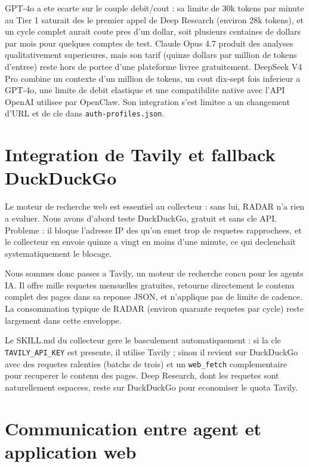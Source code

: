 \documentclass[12pt,a4paper,openany]{report}
\begin{document}
GPT-4o a ete ecarte sur le couple debit/cout : sa limite de 30k tokens par minute au Tier 1 saturait des le premier appel de Deep Research (environ 28k tokens), et un cycle complet aurait coute pres d'un dollar, soit plusieurs centaines de dollars par mois pour quelques comptes de test. Claude Opus 4.7 produit des analyses qualitativement superieures, mais son tarif (quinze dollars par million de tokens d'entree) reste hors de portee d'une plateforme livree gratuitement. DeepSeek V4 Pro combine un contexte d'un million de tokens, un cout dix-sept fois inferieur a GPT-4o, une limite de debit elastique et une compatibilite native avec l'API OpenAI utilisee par OpenClaw. Son integration s'est limitee a un changement d'URL et de cle dans \texttt{auth-profiles.json}.

\section{Integration de Tavily et fallback DuckDuckGo}
\label{sec:integration-tavily}

Le moteur de recherche web est essentiel au collecteur : sans lui, RADAR n'a rien a evaluer. Nous avons d'abord teste DuckDuckGo, gratuit et sans cle API. Probleme : il bloque l'adresse IP des qu'on emet trop de requetes rapprochees, et le collecteur en envoie quinze a vingt en moins d'une minute, ce qui declenchait systematiquement le blocage.

Nous sommes donc passes a Tavily, un moteur de recherche concu pour les agents IA. Il offre mille requetes mensuelles gratuites, retourne directement le contenu complet des pages dans sa reponse JSON, et n'applique pas de limite de cadence. La consommation typique de RADAR (environ quarante requetes par cycle) reste largement dans cette enveloppe.

Le SKILL.md du collecteur gere le basculement automatiquement : si la cle \texttt{TAVILY\_API\_KEY} est presente, il utilise Tavily ; sinon il revient sur DuckDuckGo avec des requetes ralenties (batchs de trois) et un \texttt{web\_fetch} complementaire pour recuperer le contenu des pages. Deep Research, dont les requetes sont naturellement espacees, reste sur DuckDuckGo pour economiser le quota Tavily.

\section{Communication entre agent et application web}
\label{sec:communication-agent-web}
\end{document}
